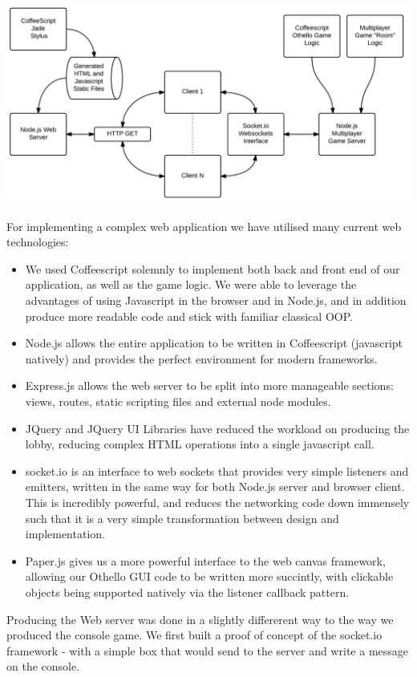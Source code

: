 \documentclass[a4wide, 11pt]{article}
\begin{document}
\includegraphics[width=\textwidth]{SoftwareEngineering.png}

For implementing a complex web application we have utilised many current web technologies:
\begin{itemize}
\item We used Coffeescript solemnly to implement both back and front end of our application, as well as the game logic. We were able to leverage the advantages of using Javascript in the browser and in Node.js, and in addition produce more readable code and stick with familiar classical OOP.
\item Node.js allows the entire application to be written in Coffeescript (javascript natively) and provides the perfect environment for modern frameworks.
\item Express.js allows the web server to be split into more manageable sections: views, routes, static scripting files and external node modules.
\item JQuery and JQuery UI Libraries have reduced the workload on producing the lobby, reducing complex HTML operations into a single javascript call.
\item socket.io is an interface to web sockets that provides very simple listeners and emitters, written in the same way for both Node.js server and browser client. This is incredibly powerful, and reduces the networking code down immensely such that it is a very simple transformation between design and implementation.
\item Paper.js gives us a more powerful interface to the web canvas framework, allowing our Othello GUI code to be written more succintly, with clickable objects being supported natively via the listener callback pattern.
\end{itemize}

Producing the Web server was done in a slightly differerent way to the way we produced the console game. We first built a proof of concept of the socket.io framework - with a simple box that would send to the server and write a message on the console. 
\end{document}
